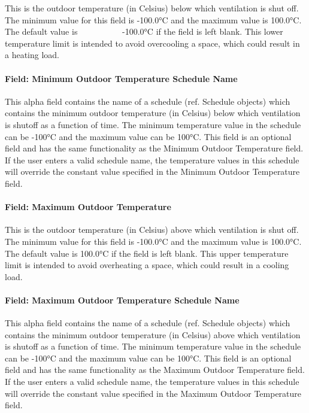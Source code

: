 This is the outdoor temperature (in Celsius) below which ventilation is shut off. The minimum value for this field is -100.0°C and the maximum value is 100.0°C. The default value is~~~~~~~~~~ -100.0°C if the field is left blank. This lower temperature limit is intended to avoid overcooling a space, which could result in a heating load.

\paragraph{Field: Minimum Outdoor Temperature Schedule Name}\label{field-minimum-outdoor-temperature-schedule-name-1}

This alpha field contains the name of a schedule (ref. Schedule objects) which contains the minimum outdoor temperature (in Celsius) below which ventilation is shutoff as a function of time. The minimum temperature value in the schedule can be -100°C and the maximum value can be 100°C. This field is an optional field and has the same functionality as the Minimum Outdoor Temperature field. If the user enters a valid schedule name, the temperature values in this schedule will override the constant value specified in the Minimum Outdoor Temperature field.

\paragraph{Field: Maximum Outdoor Temperature}\label{field-maximum-outdoor-temperature-1}

This is the outdoor temperature (in Celsius) above which ventilation is shut off. The minimum value for this field is -100.0°C and the maximum value is 100.0°C. The default value is 100.0°C if the field is left blank. This upper temperature limit is intended to avoid overheating a space, which could result in a cooling load.

\paragraph{Field: Maximum Outdoor Temperature Schedule Name}\label{field-maximum-outdoor-temperature-schedule-name-1}

This alpha field contains the name of a schedule (ref. Schedule objects) which contains the minimum outdoor temperature (in Celsius) above which ventilation is shutoff as a function of time. The minimum temperature value in the schedule can be -100°C and the maximum value can be 100°C. This field is an optional field and has the same functionality as the Maximum Outdoor Temperature field. If the user enters a valid schedule name, the temperature values in this schedule will override the constant value specified in the Maximum Outdoor Temperature field.

